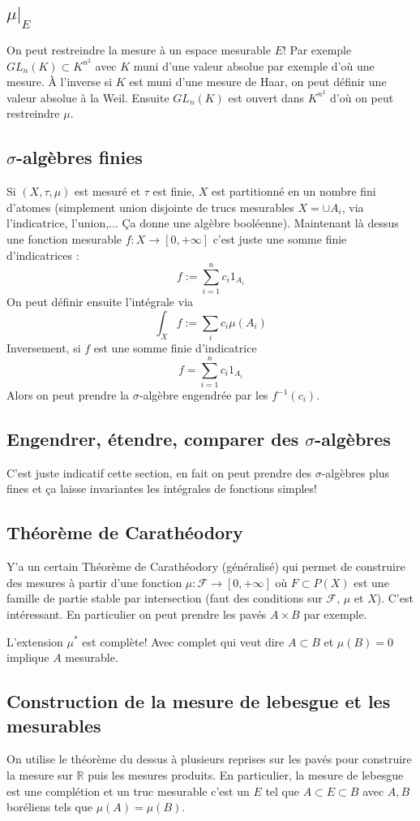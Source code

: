\documentclass[a4paper,12pt]{book}
\newcommand{\R}{\mathbb{R}}
\newcommand{\F}{\mathscr F}
\theoremstyle{plain}
\theoremstyle{definition}
\theoremstyle{remark}
\begin{document}
\subsection{$\mu|_E$}
On peut restreindre la mesure à un espace mesurable $E$!
Par exemple $GL_n(K)\subset K^{n^2}$ avec $K$ muni d'une
valeur absolue par exemple d'où une mesure. À l'inverse
si $K$ est muni d'une mesure de Haar, on peut définir une valeur absolue
à la Weil. Ensuite $GL_n(K)$ est ouvert dans $K^{n^2}$
d'où on peut restreindre $\mu$.

\subsection{$\sigma$-algèbres finies}
Si $(X,\tau,\mu)$ est mesuré et $\tau$ est finie, 
$X$ est partitionné en un nombre fini d'atomes
(simplement union disjointe de trucs mesurables $X=\cup A_i$,
via l'indicatrice, l'union,... Ça donne une algèbre booléenne).
Maintenant là dessus une fonction mesurable $f\colon X\to [0,+\infty]$
c'est juste une somme finie d'indicatrices :
\[f:=\sum_{i=1}^n c_i 1_{A_i}\]
On peut définir ensuite l'intégrale via
\[\int_X f:=\sum_i c_i\mu(A_i)\]
Inversement, si $f$ est une somme finie d'indicatrice
\[f=\sum_{i=1}^n c_i 1_{A_i}\]
Alors on peut prendre la $\sigma$-algèbre engendrée par
les $f^{-1}(c_i)$.
\subsection{Engendrer, étendre, comparer des $\sigma$-algèbres}
C'est juste indicatif cette section, en fait on peut prendre
des $\sigma$-algèbres plus fines et ça laisse invariantes
les intégrales de fonctions simples!

\subsection{Théorème de Carathéodory}
Y'a un certain Théorème de Carathéodory (généralisé) qui permet
de construire des mesures à partir d'une fonction 
$\mu\colon \F\to [0,+\infty]$ où $F\subset P(X)$ est une famille de
partie stable par intersection (faut des conditions sur $\F$, $\mu$
et $X$). C'est intéressant. En particulier
on peut prendre les pavés $A\times B$ par exemple.

L'extension $\mu^*$ est complète! Avec complet qui veut dire
$A\subset B$ et $\mu(B)=0$ implique $A$ mesurable.

\subsection{Construction de la mesure de lebesgue et les mesurables}
On utilise le théorème du dessus à plusieurs reprises sur
les pavés pour construire la mesure sur $\R$ puis les mesures
produits.  En particulier, la mesure de lebesgue est une complétion
et un truc mesurable c'est un $E$ tel que $A\subset E\subset B$
avec $A,B$ boréliens tels que $\mu(A)=\mu(B)$.
\end{document}
